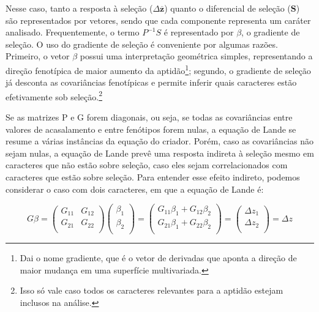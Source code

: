 \begin{refsection}
Nesse caso, tanto a resposta à seleção ($\Delta \mathbf{\overline z}$) quanto
o diferencial de seleção ($\mathbf{S}$) são representados por vetores, sendo
que cada componente representa um caráter analisado. Frequentemente, o termo
$P^{-1}S$ é representado por $\beta$, o gradiente de seleção. O uso do
gradiente de seleção é conveniente por algumas razões. Primeiro, o vetor
$\beta$ possui uma interpretação geométrica simples, representando a direção
fenotípica de maior aumento da aptidão\footnote{Dai o nome gradiente, que é o
vetor de derivadas que aponta a direção de maior mudança em uma superfície
multivariada.}; segundo, o gradiente de seleção já desconta as covariâncias
fenotípicas e permite inferir quais caracteres estão efetivamente sob
seleção.\footnote{Isso só vale caso todos os caracteres relevantes para a
aptidão estejam inclusos na análise.}

Se as matrizes P e G forem diagonais, ou seja, se todas as covariâncias entre
valores de acasalamento e entre fenótipos forem nulas, a equação de Lande se
resume a várias instâncias da equação do criador. Porém, caso as covariâncias
não sejam nulas, a equação de Lande prevê uma resposta indireta à seleção
mesmo em caracteres que não estão sobre seleção, caso eles sejam
correlacionados com caracteres que estão sobre seleção. Para entender esse
efeito indireto, podemos considerar o caso com dois caracteres, em que a
equação de Lande é:

\begin{equation}
G\beta  =
\left (
\begin{matrix}
G_{11} & G_{12} \\
G_{21} & G_{22} \\
\end{matrix}
\right )
\left (
\begin{matrix}
\beta_{1}  \\
\beta_{2}   \\
\end{matrix}
\right )
=
\left (
\begin{matrix}
G_{11}\beta_{1} +  G_{12}\beta_{2} \\
G_{21}\beta_{1} +  G_{22}\beta_{2} \\
\end{matrix}
\right )
=
\left (
\begin{matrix}
\Delta z_{1}  \\
\Delta z_{2}   \\
\end{matrix}
\right )
=
\Delta z
\end{equation}


\end{refsection}

